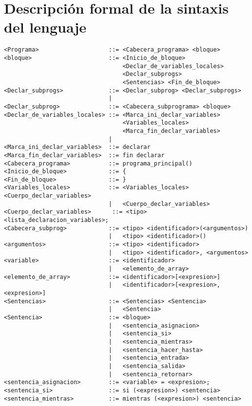 \section{Descripción formal de la sintaxis del lenguaje}

\begin{verbatim}
<Programa>                    ::= <Cabecera_programa> <bloque>
<bloque>                      ::= <Inicio_de_bloque>
                                  <Declar_de_variables_locales>
                                  <Declar_subprogs>
                                  <Sentencias> <Fin_de_bloque>
<Declar_subprogs>             ::= <Declar_subprog> <Declar_subprogs>
                              |
<Declar_subprog>              ::= <Cabecera_subprograma> <bloque>
<Declar_de_variables_locales> ::= <Marca_ini_declar_variables>
                                  <Variables_locales>
                                  <Marca_fin_declar_variables>
                              |
<Marca_ini_declar_variables>  ::= declarar
<Marca_fin_declar_variables>  ::= fin declarar
<Cabecera_programa>           ::= programa_principal()
<Inicio_de_bloque>            ::= {
<Fin_de_bloque>               ::= }
<Variables_locales>           ::= <Variables_locales> <Cuerpo_declar_variables>
                              |   <Cuerpo_declar_variables>
<Cuerpo_declar_variables>      ::= <tipo> <lista_declaracion_variables>;
<Cabecera_subprog>            ::= <tipo> <identificador>(<argumentos>)
                              |   <tipo> <identificador>()
<argumentos>                  ::= <tipo> <identificador>
                              |   <tipo> <identificador>, <argumentos>
<variable>                    ::= <identificador>
                              |   <elemento_de_array>
<elemento_de_array>           ::= <identificador>[<expresion>]
                              |   <identificador>[<expresion>, <expresion>]
<Sentencias>                  ::= <Sentencias> <Sentencia>
                              |   <Sentencia>
<Sentencia>                   ::= <bloque>
                              |   <sentencia_asignacion>
                              |   <sentencia_si>
                              |   <sentencia_mientras>
                              |   <sentencia_hacer_hasta>
                              |   <sentencia_entrada>
                              |   <sentencia_salida>
                              |   <sentencia_retornar>
<sentencia_asignacion>        ::= <variable> = <expresion>;
<sentencia_si>                ::= si (<expresion>) <sentencia>
<sentencia_mientras>          ::= mientras (<expresion>) <sentencia>

\end{verbatim}
